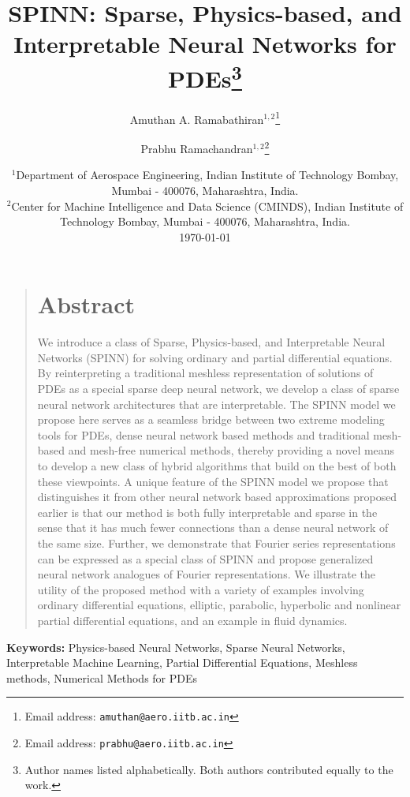 \documentclass[12pt]{article}
\title{SPINN: Sparse, Physics-based, and Interpretable Neural Networks for PDEs\footnote{Author names listed alphabetically. Both authors contributed equally to the work.}}
\author{\textsf{Amuthan A. Ramabathiran}$^{1,2}$\footnote{Email address: \texttt{amuthan@aero.iitb.ac.in}} \and \textsf{Prabhu Ramachandran}$^{1,2}$\footnote{Email address: \texttt{prabhu@aero.iitb.ac.in}}}
\date{%
	$^1${\small Department of Aerospace Engineering, Indian Institute of Technology Bombay, Mumbai - 400076, Maharashtra, India.}\\[2ex]%
	$^2${\small Center for Machine Intelligence and Data Science (CMINDS), Indian Institute of Technology Bombay, Mumbai - 400076, Maharashtra, India.}\\[2ex]%
	\today
}
\providecommand{\keywords}[1]{\textbf{\textsf{Keywords:}} #1}
\begin{document}
\maketitle

\begin{quote}
\section*{Abstract}
We introduce a class of Sparse, Physics-based, and Interpretable Neural Networks (SPINN) for solving ordinary and partial differential equations. By reinterpreting a traditional meshless representation of solutions of PDEs as a special sparse deep neural network, we develop a class of sparse neural network architectures that are interpretable. The SPINN model we propose here serves as a seamless bridge between two extreme modeling tools for PDEs, dense neural network based methods and traditional mesh-based and mesh-free numerical methods, thereby providing a novel means to develop a new class of hybrid algorithms that build on the best of both these viewpoints. A unique feature of the SPINN model we propose that distinguishes it from other neural network based approximations proposed earlier is that our method is both fully interpretable and sparse in the sense that it has much fewer connections than a dense neural network of the same size. Further, we demonstrate that Fourier series representations can be expressed as a special class of SPINN and propose generalized neural network analogues of Fourier representations. We illustrate the utility of the proposed method with a variety of examples involving ordinary differential equations, elliptic, parabolic, hyperbolic and nonlinear partial differential equations, and an example in fluid dynamics. 
\end{quote}


\keywords{Physics-based Neural Networks, Sparse Neural Networks, Interpretable Machine Learning, Partial Differential Equations, Meshless methods, Numerical Methods for PDEs}

\linenumbers
\end{document}

